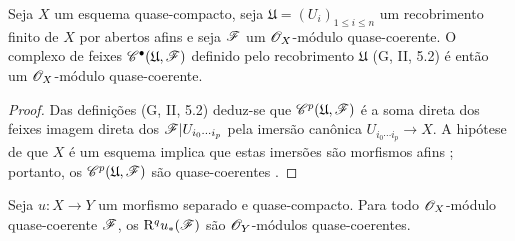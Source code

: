 \begin{lemma}[1.4.9]
\label{III.1.4.9}
Seja $X$ um esquema quase-compacto, seja $\mathfrak{U}=(U_i)_{1\leq i\leq n}$ um recobrimento finito de $X$ por abertos afins e seja $\mathscr{F}$ um $\mathscr{O}_X$-módulo quase-coerente.
O complexo de feixes $\mathscr{C}^\bullet(\mathfrak{U},\mathscr{F})$ definido pelo recobrimento $\mathfrak{U}$ (G, II, 5.2) é então um $\mathscr{O}_X$-módulo quase-coerente.
\end{lemma}

\begin{proof}
Das definições (G, II, 5.2) deduz-se que $\mathscr{C}^p(\mathfrak{U},\mathscr{F})$ é a soma direta dos feixes imagem direta dos $\mathscr{F}|U_{i_0\cdots i_p}$ pela imersão canônica $U_{i_0\cdots i_p}\to X$.
A hipótese de que $X$ é um esquema implica que estas imersões são morfismos afins ; portanto, os $\mathscr{C}^p(\mathfrak{U},\mathscr{F})$ são quase-coerentes .
\end{proof}

\begin{proposition}[1.4.10]
\label{III.1.4.10}
Seja $u:X\to Y$ um morfismo separado e quase-compacto.
Para todo $\mathscr{O}_X$-módulo quase-coerente $\mathscr{F}$, os $\mathrm{R}^q u_*(\mathscr{F})$ são $\mathscr{O}_Y$-módulos quase-coerentes.
\end{proposition}

